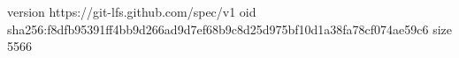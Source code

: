 version https://git-lfs.github.com/spec/v1
oid sha256:f8dfb95391ff4bb9d266ad9d7ef68b9c8d25d975bf10d1a38fa78cf074ae59c6
size 5566
